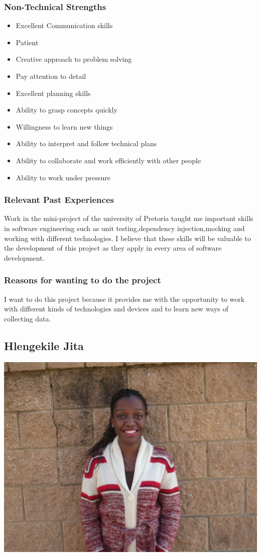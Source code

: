 \documentclass[a4paper,12pt]{article}
\begin{document}
\subsubsection{Non-Technical Strengths}
\begin{itemize}
\item Excellent Communication skills
\item Patient
\item Creative approach to problem solving
\item Pay attention to detail
\item Excellent planning skills
\item Ability to grasp concepts quickly
\item Willingness to learn new things
\item Ability to interpret and follow technical plans
\item Ability to collaborate and work efficiently with other people
\item Ability to work under pressure
\end{itemize}
\subsubsection{Relevant Past Experiences}
Work in the mini-project of the university of Pretoria taught me important skills in software engineering such as unit testing,dependency injection,mocking and working with different technologies. I believe that these skills will be valuable to the development of this project as they apply in every area of software development.
\subsubsection{Reasons for wanting to do the project}
I want to do this project because it provides me with the opportunity to work with different kinds of technologies and devices and to learn new ways of collecting data.
\newpage
\subsection{Hlengekile Jita}
\includegraphics[width=\textwidth]{images/Hlengi}
\end{document}
